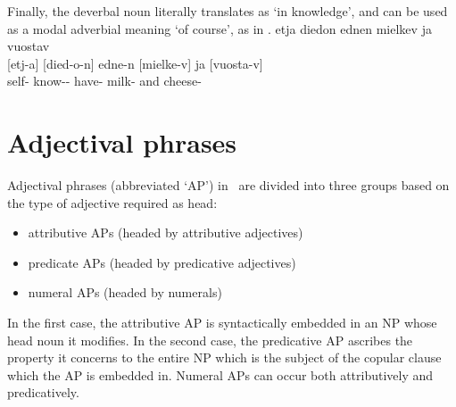 Finally, the deverbal noun  literally translates as ‘in knowledge’, and can be used as a modal adverbial meaning ‘of course’, as in . 
\ea\label{ADVnounsEx3}%
\glll	etja diedon ednen mielkev ja vuostav\\
	{[etj-a]\subNP{}} {[died-o-n]\subNP{}} edne-n {[mielke-v]\subNP{}} ja {[vuosta-v]\subNP{}}\\
	self- know-- have- milk- and cheese-\\\nopagebreak
{}	
\z



\section{Adjectival phrases}\label{adjectivalPhrases}
Adjectival phrases (abbreviated ‘AP’) in \PS\ are divided into three groups based on the type of adjective required as head: 
\begin{itemize}
\item{attributive APs (headed by attributive adjectives)}%
\item{predicate APs (headed by predicative adjectives)}%
\item{numeral APs (headed by numerals)}%
\end{itemize}
In the first case, the attributive AP is syntactically embedded in an NP whose head noun it modifies. In the second case, the predicative AP ascribes the property it concerns to the entire NP which is the subject of the copular clause which the AP is embedded in. Numeral APs can occur both attributively and predicatively. 

